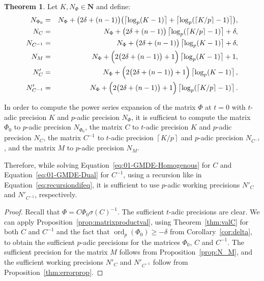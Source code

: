 \documentclass[a4paper,11pt]{article}
\numberwithin{equation}{section}
\providecommand{\ceil}[1]{\left\lceil#1\right\rceil}   %
\newcommand{\NN}{\mathbf{N}} %
\DeclareMathOperator{\ord}{ord}          %
\theoremstyle{definition}
\newtheorem{thm}{Theorem}[section]
\begin{document}
\begin{thm} \label{thm:Ni}
Let $K,N_{\Phi} \in \NN$ and define:
\begin{eqnarray*}
N_{\Phi_0}   		&=& N_{\Phi}+\bigl(2\delta+(n-1)\bigr) \bigl( \ceil{\log_p(K-1)} + \ceil{\log_p(\ceil{K/p}-1)}\bigr),\\
N_{C}				&=& N_{\Phi}+\bigl(2\delta+(n-1)\bigr) \ceil{ \log_p(\ceil{K/p}-1)} + \delta, \\
N_{C^{-1}}			&=& N_{\Phi}+\bigl(2\delta+(n-1)\bigr) \ceil{\log_p(K-1)} + \delta, \\
N_M                 &=& N_{\Phi}+\Bigl(2\bigl(2 \delta + (n-1)\bigr) + 1\Bigr) \ceil{\log_p(K-1)}+1, \\
N'_C			    &=& N_{\Phi}+\Bigl(2 \bigl(2 \delta + (n-1)\bigr) + 1\Bigr) \ceil{\log_p(K-1)}, \\
N'_{C^{-1}}	        &=& N_{\Phi}+\Bigl(2 \bigl(2 \delta + (n-1)\bigr) + 1\Bigr) \ceil{\log_p(\ceil{K/p}-1)}.
\end{eqnarray*}

In order to compute the power series expansion 
of the matrix $\Phi$ at $t=0$ with $t$-adic precision $K$ and $p$-adic precision $N_{\Phi}$,
it is sufficient to compute
the matrix $\Phi_0$ to $p$-adic precision $N_{\Phi_0}$,
the matrix $C$ to $t$-adic precision $K$ and $p$-adic precision $N_{C}$, 
the matrix $C^{-1}$ to $t$-adic precision $\ceil{K/p}$ and $p$-adic precision 
$N_{C^{-1}}$, and 
the matrix $M$ to $p$-adic precision $N_M$.

Therefore, while solving Equation~\eqref{eq:01-GMDE-Homogenous} for $C$ and 
Equation~\eqref{eq:01-GMDE-Dual} for $C^{-1}$, using a recursion like in 
Equation~\eqref{eq:recursiondifeq}, it is sufficient to use $p$-adic 
working precisions $N'_C$ and $N'_{C^{-1}}$, respectively.
\end{thm}

\begin{proof}
Recall that $\Phi = C \Phi_0 \sigma(C)^{-1}$. The sufficient $t$-adic 
precisions are clear. We can apply Proposition~\ref{prop:matrixproductval}, 
using Theorem~\ref{thm:valC} for both $C$ and $C^{-1}$ and the fact that 
$\ord_p(\Phi_0) \geq -\delta$ from Corollary~\ref{cor:delta}, to obtain 
the sufficient $p$-adic precisions for the matrices $\Phi_0$, $C$ and $C^{-1}$. 
The sufficient precision for the matrix $M$ follows from Proposition~\ref{prop:N_M},
and the sufficient working precisions $N'_C$ and $N'_{C^{-1}}$
follow from Proposition~\ref{thm:errorprop}.
\end{proof}
\end{document}
